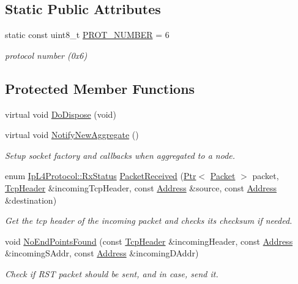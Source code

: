 \subsection*{Static Public Attributes}
\begin{DoxyCompactItemize}
\item 
static const uint8\+\_\+t \hyperlink{classns3_1_1TcpL4Protocol_ac6c1cee44ae21227e755678bb52dbc89}{P\+R\+O\+T\+\_\+\+N\+U\+M\+B\+ER} = 6
\begin{DoxyCompactList}\small\item\em protocol number (0x6) \end{DoxyCompactList}\end{DoxyCompactItemize}
\subsection*{Protected Member Functions}
\begin{DoxyCompactItemize}
\item 
virtual void \hyperlink{classns3_1_1TcpL4Protocol_a9d2286b9af7437138f6c1c8ecdaa048d}{Do\+Dispose} (void)
\item 
virtual void \hyperlink{classns3_1_1TcpL4Protocol_ace34214dade5d0c0c2220ad01866111c}{Notify\+New\+Aggregate} ()
\begin{DoxyCompactList}\small\item\em Setup socket factory and callbacks when aggregated to a node. \end{DoxyCompactList}\item 
enum \hyperlink{classns3_1_1IpL4Protocol_afd3744c89902fff232e2fd45f558c80e}{Ip\+L4\+Protocol\+::\+Rx\+Status} \hyperlink{classns3_1_1TcpL4Protocol_a3ff49ecbf02516282f7b8158819f432b}{Packet\+Received} (\hyperlink{classns3_1_1Ptr}{Ptr}$<$ \hyperlink{classns3_1_1Packet}{Packet} $>$ packet, \hyperlink{classns3_1_1TcpHeader}{Tcp\+Header} \&incoming\+Tcp\+Header, const \hyperlink{classns3_1_1Address}{Address} \&source, const \hyperlink{classns3_1_1Address}{Address} \&destination)
\begin{DoxyCompactList}\small\item\em Get the tcp header of the incoming packet and checks its checksum if needed. \end{DoxyCompactList}\item 
void \hyperlink{classns3_1_1TcpL4Protocol_a16c65189190c60da860bc60681c01324}{No\+End\+Points\+Found} (const \hyperlink{classns3_1_1TcpHeader}{Tcp\+Header} \&incoming\+Header, const \hyperlink{classns3_1_1Address}{Address} \&incoming\+S\+Addr, const \hyperlink{classns3_1_1Address}{Address} \&incoming\+D\+Addr)
\begin{DoxyCompactList}\small\item\em Check if R\+ST packet should be sent, and in case, send it. \end{DoxyCompactList}\end{DoxyCompactItemize}
